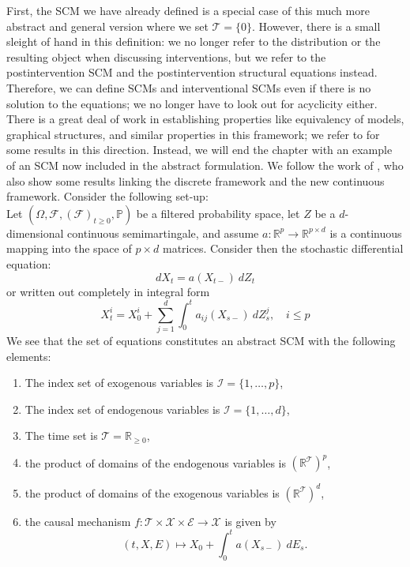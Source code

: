 \documentclass[11pt, a4paper]{memoir}
\theoremstyle{break}
\theoremstyle{break}
\theoremstyle{nonumberplain}
\newcommand{\mR}{\mathbb{R}}
\newcommand{\mP}{\mathbb{P}}
\begin{document}
First, the SCM we have already defined is a special case of this much more abstract and general version where we set $\mathcal{T}=\{0\}$. However, there is a small sleight of hand in this definition: we no longer refer to the distribution or the resulting object when discussing interventions, but we refer to the postintervention SCM and the postintervention structural equations instead. Therefore, we can define SCMs and interventional SCMs even if there is no solution to the equations; we no longer have to look out for acyclicity either. There is a great deal of work in establishing properties like equivalency of models, graphical structures, and similar properties in this framework; we refer to \cite{SCMGen} for some results in this direction. Instead, we will end the chapter with an example of an SCM now included in the abstract formulation. We follow the work of \cite{sokol2014}, who also show some results linking the discrete framework and the new continuous framework. Consider the following set-up:\\[5pt]
Let $(\Omega, \mathcal{F},(\mathcal{F})_{t\geq 0},\mP)$ be a filtered probability space, let $Z$ be a $d$-dimensional continuous semimartingale, and assume $a:\mR^p\to \mR^{p\times d}$ is a continuous mapping into the space of $p\times d$ matrices. Consider then the stochastic differential equation:
$$dX_t=a(X_{t-})\ dZ_t$$
or written out completely in integral form
\begin{equation}\label{org}
X_t^i=X_0^i+\sum_{j=1}^d\int_0^t a_{ij}(X_{s-})\ dZ_s^j,\quad i\leqslant p
\end{equation}
We see that the set of equations constitutes an abstract SCM with the following elements:
\begin{enumerate}[label=\arabic*)]
	\item The index set of exogenous variables is $\mathcal{I}=\{1,\ldots, p\}$,
	\item The index set of endogenous variables is $\mathcal{I}=\{1,\ldots, d\}$,
	\item The time set is $\mathcal{T}=\mR_{\geqslant 0}$,
	\item the product of domains of the endogenous variables is $(\mR^{\mathcal{T}})^p$,
	\item the product of domains of the exogenous variables is $(\mR^{\mathcal{T}})^d$,
	\item the causal mechanism $f:\mathcal{T}\times \mathcal{X}\times \mathcal{E}\to \mathcal{X}$ is given by $$(t,X,E)\mapsto X_0 + \int_0^t a(X_{s-})\ dE_s.$$
\end{enumerate}
\end{document}
